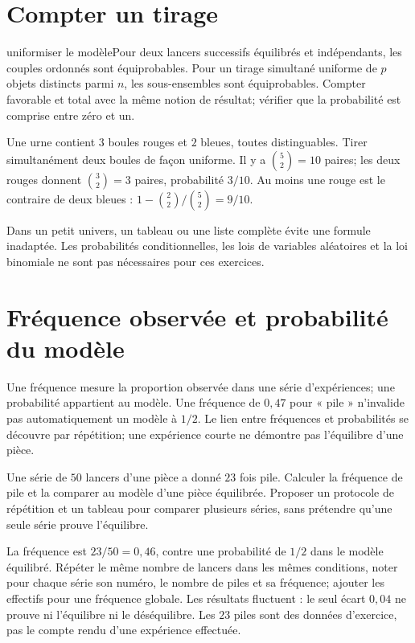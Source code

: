 \section{Compter un tirage}
\begin{methode}{uniformiser le modèle}Pour deux lancers successifs équilibrés et indépendants, les couples ordonnés sont équiprobables. Pour un tirage simultané uniforme de $p$ objets distincts parmi $n$, les sous-ensembles sont équiprobables. Compter favorable et total avec la même notion de résultat; vérifier que la probabilité est comprise entre zéro et un.\end{methode}
\begin{exemple}
Une urne contient $3$ boules rouges et $2$ bleues, toutes distinguables. Tirer simultanément deux boules de façon uniforme. Il y a $\binom52=10$ paires; les deux rouges donnent $\binom32=3$ paires, probabilité $3/10$. Au moins une rouge est le contraire de deux bleues : $1-\binom22/\binom52=9/10$.
\end{exemple}
\begin{remarque}Dans un petit univers, un tableau ou une liste complète évite une formule inadaptée. Les probabilités conditionnelles, les lois de variables aléatoires et la loi binomiale ne sont pas nécessaires pour ces exercices.\end{remarque}
\section{Fréquence observée et probabilité du modèle}
Une fréquence mesure la proportion observée dans une série d’expériences; une probabilité appartient au modèle. Une fréquence de $0{,}47$ pour « pile » n’invalide pas automatiquement un modèle à $1/2$. Le lien entre fréquences et probabilités se découvre par répétition; une expérience courte ne démontre pas l’équilibre d’une pièce.

\begin{situation}
\exo\label{t11s-c20-act}Une série de $50$ lancers d’une pièce a donné $23$ fois pile. Calculer la fréquence de pile et la comparer au modèle d’une pièce équilibrée. Proposer un protocole de répétition et un tableau pour comparer plusieurs séries, sans prétendre qu’une seule série prouve l’équilibre.
\end{situation}
\begin{corrige}\label{sol-t11s-c20-act}
La fréquence est $23/50=0{,}46$, contre une probabilité de $1/2$ dans le modèle équilibré. Répéter le même nombre de lancers dans les mêmes conditions, noter pour chaque série son numéro, le nombre de piles et sa fréquence; ajouter les effectifs pour une fréquence globale. Les résultats fluctuent : le seul écart $0{,}04$ ne prouve ni l’équilibre ni le déséquilibre. Les $23$ piles sont des données d’exercice, pas le compte rendu d’une expérience effectuée.
\end{corrige}

